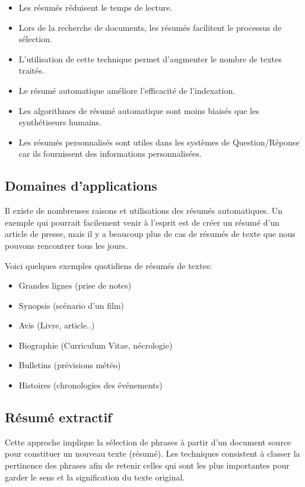     \begin{itemize}
        \item Les résumés réduisent le temps de lecture.
        \item Lors de la recherche de documents, les résumés facilitent le processus de sélection.
        \item L'utilisation de cette technique permet d'augmenter le nombre de textes traités.
        \item Le résumé automatique améliore l'efficacité de l'indexation.
        \item Les algorithmes de résumé automatique sont moins biaisés que les synthétiseurs humains.
        \item Les résumés personnalisés sont utiles dans les systèmes de Question/Réponse car ils fournissent des informations personnalisées.
    \end{itemize}

    \subsection{Domaines d'applications}    
    Il existe de nombreuses raisons et utilisations des résumés automatiques. Un exemple qui pourrait facilement venir à l'esprit est de créer un résumé d'un article de presse, mais il y a beaucoup plus de cas de résumés de texte que nous pouvons rencontrer tous les jours.

    Voici quelques exemples quotidiens de résumés de textes:
    \begin{itemize}
        \item Grandes lignes (prise de notes)
        \item Synopsis (scénario d'un film)
        \item Avis (Livre, article..)
        \item Biographie (Curriculum Vitae, nécrologie)
        \item Bulletins (prévisions météo)
        \item Histoires (chronologies des événements)
    \end{itemize}

    \subsection{Résumé extractif}
        Cette approche implique la sélection de phrases à partir d'un document source pour constituer un nouveau texte (résumé). Les techniques consistent à classer la pertinence des phrases afin de retenir celles qui sont les plus importantes pour garder le sens et la signification du texte original.


